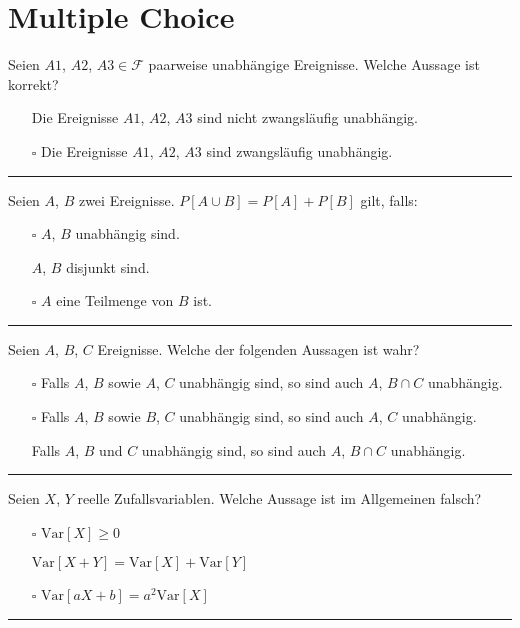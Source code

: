 \section{Multiple Choice}
\begin{tiny}
    Seien $A1$, $A2$, $A3 \in \mathcal{F}$ paarweise unabhängige Ereignisse. Welche Aussage ist korrekt?
    \begin{itemize}
        \item[\checkmark] Die Ereignisse $A1$, $A2$, $A3$ sind nicht zwangsläufig unabhängig.
        \item[$\square$] Die Ereignisse $A1$, $A2$, $A3$ sind zwangsläufig unabhängig.
    \end{itemize}
    \rule{\linewidth}{0.4pt}

    Seien $A$, $B$ zwei Ereignisse. $P[A \cup B] = P[A] + P[B]$ gilt, falls:
    \begin{itemize}
        \item[$\square$] $A$, $B$ unabhängig sind.
        \item[\checkmark] $A$, $B$ disjunkt sind.
        \item[$\square$] $A$ eine Teilmenge von $B$ ist.
    \end{itemize}
    \rule{\linewidth}{0.4pt}

    Seien $A$, $B$, $C$ Ereignisse. Welche der folgenden Aussagen ist wahr?
    \begin{itemize}
        \item[$\square$] Falls $A$, $B$ sowie $A$, $C$ unabhängig sind, so sind auch $A$, $B \cap C$ unabhängig.
        \item[$\square$] Falls $A$, $B$ sowie $B$, $C$ unabhängig sind, so sind auch $A$, $C$ unabhängig.
        \item[\checkmark] Falls $A$, $B$ und $C$ unabhängig sind, so sind auch $A$, $B \cap C$ unabhängig.
    \end{itemize}
    \rule{\linewidth}{0.4pt}

    Seien $X$, $Y$ reelle Zufallsvariablen. Welche Aussage ist im Allgemeinen falsch?
    \begin{itemize}
        \item[$\square$] $\text{Var}[X] \geq 0$
        \item[\checkmark] $\text{Var}[X + Y] = \text{Var}[X] + \text{Var}[Y]$
        \item[$\square$] $\text{Var}[aX + b] = a^2 \text{Var}[X]$
    \end{itemize}
    \rule{\linewidth}{0.4pt}


\end{tiny}
